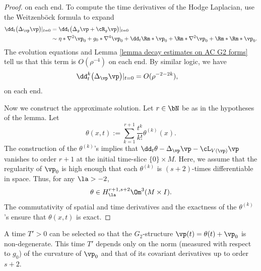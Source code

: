 \documentclass[hidelinks, 12pt, oneside, reqno]{amsart}
\begin{document}
\begin{proof}
    on each end. To compute the time derivatives of the Hodge Laplacian, use the Weitzenb\"ock formula to expand
    \begin{align*}
    \dd_t\big(\Delta_{\vp} \vp\big) |_{t=0} &= \dd_t\big(\Delta_g \vp + \cR_g \vp \big) |_{t=0} \\
    &\sim \eta * \nabla^2 \vp_0 + g_0 * \nabla^4 \vp_0 + \dd_t \Rm * \vp_0 + \Rm * \nabla^2 \vp_0 + \Rm * \Rm * \vp_0.
    \end{align*}
    The evolution equations and Lemma \ref{lemma decay estimates on AC G2 forms} tell us that this term is $O(\rho^{-4})$ on each end. By similar logic, we have 
    \begin{align*}
        \dd^k_t \big(\Delta_{\vp}\vp\big)|_{t=0} &= O(\rho^{-2 - 2k}),
    \end{align*}
    on each end.

    Now we construct the approximate solution.  Let $r \in \bN$ be as in the hypotheses of the lemma.
    Let 
    \begin{equation}\label{equation approximate solution first pass}
    \theta (x,t) := \sum_{k=1}^{r+1} \frac{t^k}{k!}\theta^{(k)}(x).
    \end{equation}
    The construction of the $\theta^{(k)}$'s implies that $\dd_t \theta - \Delta_{\vp} \vp - \cL_{V(\vp)}\vp$ vanishes to order $r+1$ at the initial time-slice $\{0\} \times M$. Here, we assume that the regularity of $\vp_0$ is high enough that each $\theta^{(k)}$ is $(s+2)$-times differentiable in space. Thus, for any $\la > -2$, 
    \[
    \theta \in H^{r+1, s+2}_{\la} \Om^3(M \times I). 
    \]
    The commutativity of spatial and time derivatives and the exactness of the $\theta^{(k)}$'s ensure that $ \theta(x,t)$ is exact. 
\end{proof}

\begin{cor}\label{corollary equivalence of approx soln metrics}
    A time $T' > 0$ can be selected so that the $G_2$-structure $\vp(t) = \theta(t) + \vp_0$ is non-degenerate. This time $T'$ depends only on the norm (measured with respect to $g_0$) of the curvature of $\vp_0$ and that of its covariant derivatives up to order $s+2$.
\end{cor}
\end{document}
